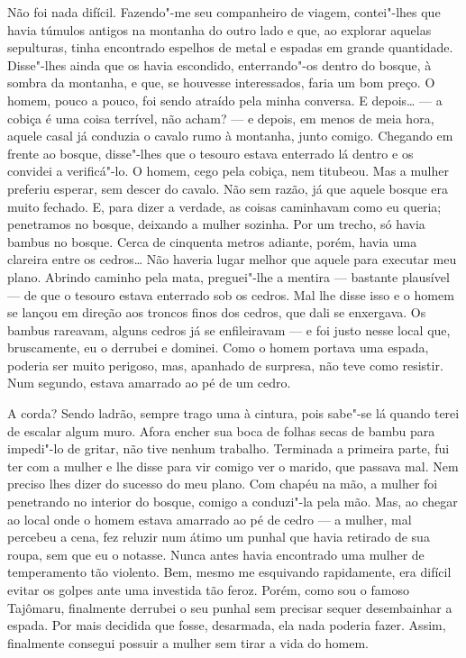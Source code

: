 Não foi nada difícil. Fazendo"-me seu companheiro de viagem, contei"-lhes
que havia túmulos antigos na montanha do outro lado e que, ao explorar
aquelas sepulturas, tinha encontrado espelhos de metal e espadas em
grande quantidade. Disse"-lhes ainda que os havia escondido,
enterrando"-os dentro do bosque, à sombra da montanha, e que, se
houvesse interessados, faria um bom preço. O homem, pouco a pouco, foi
sendo atraído pela minha conversa. E depois\ldots{} --- a cobiça é uma coisa
terrível, não acham? --- e depois, em menos de meia hora, aquele casal já
conduzia o cavalo rumo à montanha, junto comigo. Chegando em frente ao
bosque, disse"-lhes que o tesouro estava enterrado lá dentro e os
convidei a verificá"-lo. O homem, cego pela cobiça, nem titubeou. Mas a
mulher preferiu esperar, sem descer do cavalo. Não sem razão, já que
aquele bosque era muito fechado. E, para dizer a verdade, as coisas
caminhavam como eu queria; penetramos no bosque, deixando a mulher
sozinha. Por um trecho, só havia bambus no bosque. Cerca de cinquenta
metros adiante, porém, havia uma clareira entre os cedros\ldots{} Não
haveria lugar melhor que aquele para executar meu plano. Abrindo
caminho pela mata, preguei"-lhe a mentira --- bastante plausível --- de que
o tesouro estava enterrado sob os cedros. Mal lhe disse isso e o homem
se lançou em direção aos troncos finos dos cedros, que dali se
enxergava. Os bambus rareavam, alguns cedros já se enfileiravam --- e foi
justo nesse local que, bruscamente, eu o derrubei e dominei. Como o
homem portava uma espada, poderia ser muito perigoso, mas, apanhado de
surpresa, não teve como resistir. Num segundo, estava amarrado ao pé de
um cedro.

A corda? Sendo ladrão, sempre trago uma à cintura, pois sabe"-se lá
quando terei de escalar algum muro. Afora encher sua boca de folhas
secas de bambu para impedi"-lo de gritar, não tive nenhum trabalho.
Terminada a primeira parte, fui ter com a mulher e lhe disse para vir
comigo ver o marido, que passava mal. Nem preciso lhes dizer do sucesso
do meu plano. Com chapéu na mão, a mulher foi penetrando no interior do
bosque, comigo a conduzi"-la pela mão. Mas, ao chegar ao local onde o
homem estava amarrado ao pé de cedro --- a mulher, mal percebeu a cena,
fez reluzir num átimo um punhal que havia retirado de sua roupa, sem
que eu o notasse. Nunca antes havia encontrado uma mulher de
temperamento tão violento. Bem, mesmo me esquivando rapidamente, era
difícil evitar os golpes ante uma investida tão feroz. Porém, como sou
o famoso Tajômaru, finalmente derrubei o seu punhal sem precisar sequer
desembainhar a espada. Por mais decidida que fosse, desarmada, ela nada
poderia fazer. Assim, finalmente consegui possuir a mulher sem tirar a
vida do homem.

